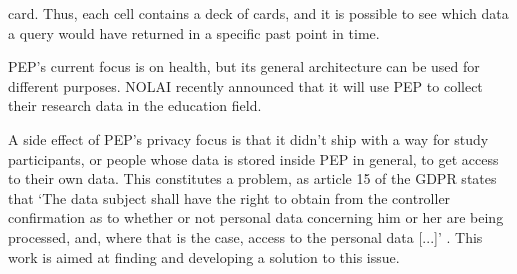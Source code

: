 \documentclass{report}
\begin{document}
card. Thus, each cell contains a deck of cards, and it is possible to see which data a query would have returned in a specific past point in time. \par
PEP's current focus is on health, but its general architecture can be used for different purposes. NOLAI \cite{nolai} \cite{pepproject} recently announced that it will use PEP to
collect their research data in the education field. \par
A side effect of PEP's privacy focus is that it didn't ship with a way for study participants, or people whose data is stored inside PEP in general, to get access to their own
data. This constitutes a problem, as article 15 of the GDPR states that \enquote*{The data subject shall have the right to obtain from the controller confirmation as to whether or not
personal data concerning him or her are being processed, and, where that is the case, access to the personal data [...]} \cite{gdpr-art-15}. 
This work is aimed at finding and developing a solution to this issue.
\end{document}
